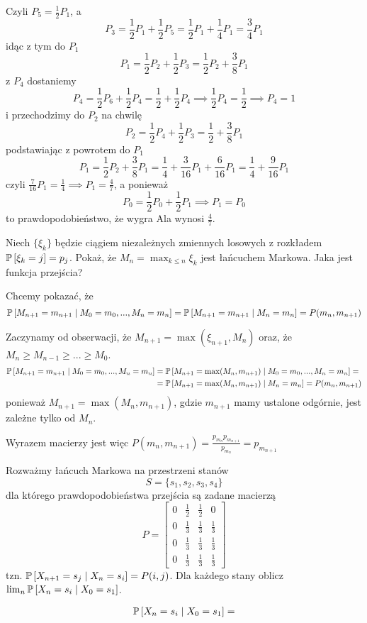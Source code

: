 \begin{solution}
  Czyli $P_5=\frac{1}{2}P_1$, a 
  $$P_3=\frac{1}{2}P_1+\frac{1}{2}P_5=\frac{1}{2}P_1+\frac{1}{4}P_1=\frac{3}{4}P_1$$
  idąc z tym do $P_1$
  $$P_1=\frac{1}{2}P_2+\frac{1}{2}P_3=\frac{1}{2}P_2+\frac{3}{8}P_1$$
  z $P_4$ dostaniemy
  $$P_4=\frac{1}{2} P_6+\frac{1}{2}P_4=\frac{1}{2}+\frac{1}{2}P_4\implies \frac{1}{2}P_4=\frac{1}{2}\implies P_4=1$$
  i przechodzimy do $P_2$ na chwilę
  $$P_2=\frac{1}{2}P_4+\frac{1}{2}P_3=\frac{1}{2}+\frac{3}{8}P_1$$
  podstawiając z powrotem do $P_1$
  $$P_1=\frac{1}{2}P_2+\frac{3}{8}P_1=\frac{1}{4}+\frac{3}{16}P_1+\frac{6}{16}P_1=\frac{1}{4}+\frac{9}{16}P_1$$
  czyli $\frac{7}{16}P_1=\frac{1}{4}\implies P_1=\frac{4}{7}$, a ponieważ
  $$P_0=\frac{1}{2}P_0+\frac{1}{2}P_1\implies P_1=P_0$$
  to prawdopodobieństwo, że wygra Ala wynosi $\frac{4}{7}$.

\end{solution}

\begin{problem}
  Niech $\{\xi_k\}$ będzie ciągiem niezależnych zmiennych losowych z rozkładem $\prob{\xi_k=j}=p_j$. Pokaż, że $M_n=\max_{k\leq n}\xi_k$ jest łańcuchem Markowa. Jaka jest funkcja przejścia?
\end{problem}

\begin{solution}
  Chcemy pokazać, że
  $$\prob{M_{n+1}=m_{n+1}}{M_0=m_0,...,M_n=m_n}=\prob{M_{n+1}=m_{n+1}}{M_n=m_n}=P(m_n,m_{n+1})$$

  Zaczynamy od obserwacji, że $M_{n+1}=\max (\xi_{n+1},M_n)$ oraz, że $M_n\geq M_{n-1}\geq ...\geq M_0$. 
  \begin{align*}
    \prob{M_{n+1}=m_{n+1}}{M_0=m_0,...,M_n=m_n}&=\prob{M_{n+1}=\max(M_n, m_{n+1})}{M_0=m_0,...,M_n=m_n}=\\ 
                                               &=\prob{M_{n+1}=\max(M_n,m_{n+1})}{M_n=m_n}=P(m_n, m_{n+1})
  \end{align*}
  ponieważ $M_{n+1}=\max(M_n,m_{n+1})$, gdzie $m_{n+1}$ mamy ustalone odgórnie, jest zależne tylko od $M_n$.
  
  Wyrazem macierzy jest więc $P(m_n,m_{n+1})=\frac{p_{m_n}p_{m_{n+1}}}{p_{m_n}}=p_{m_{n+1}}$
\end{solution}

\begin{problem}
  Rozważmy łańcuch Markowa na przestrzeni stanów 
  $$S=\{s_1, s_2,s_3,s_4\}$$ 
  dla którego prawdopodobieństwa przejścia są zadane macierzą
  $$P=\begin{bmatrix}0 &\frac{1}{2} & \frac{1}{2} & 0\\ 
  0 & \frac{1}{3} &\frac{1}{3} & \frac{1}{3}\\ 
  0 & \frac{1}{3} & \frac{1}{3} & \frac{1}{3}\\ 
0 & \frac{1}{3} & \frac{1}{3} & \frac{1}{3}\end{bmatrix}$$
tzn. $\prob{X_{n+1}=s_j}{X_n=s_i}=P(i,j)$. Dla każdego stany oblicz $\lim_n \prob{X_n=s_i}{X_0=s_1}$.
\end{problem}

\begin{solution}
  \begin{align*}
    \prob{X_n=s_i}{X_0=s_1}=
  \end{align*}
\end{solution}
